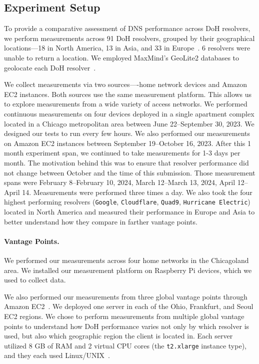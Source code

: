 \subsection{Experiment Setup}
To provide a comparative assessment of DNS
performance across DoH resolvers, we perform measurements across 91 DoH
resolvers, grouped by their geographical locations—18 in North America, 13 in
Asia, and 33 in Europe~\cite{dnscrypt}. 6 resolvers were unable to return a location. 
We employed MaxMind's GeoLite2 databases to geolocate each DoH resolver~\cite{maxmind}.

We collect measurements via two sources—-home network devices and Amazon EC2 instances. 
Both sources use the same measurement platform. This allows us to explore measurements from a wide variety
of access networks. We performed continuous measurements on four devices deployed in a single apartment complex located in a 
Chicago metropolitan area between June 22--September 30, 2023. We designed our tests to run every few hours. We also performed our measurements on Amazon EC2 instances between September 19--October 16, 2023. 
After this 1 month experiment span, we continued to take measurements for 1-3 days per month. 
The motivation behind this was to ensure that resolver performance did not change between October
and the time of this submission. Those measurement spans were February 8--February 10, 2024, 
March 12--March 13, 2024, April 12--April 14. Measurements were performed three times a day. 
We also took the four highest performing resolvers (\texttt{Google}, \texttt{Cloudflare}, \texttt{Quad9},
\texttt{Hurricane Electric}) located in North America and measured their
performance in Europe and Asia to better understand how they compare in
farther vantage points. 

\paragraph{Vantage Points.} 
We performed our measurements across four home networks in the Chicagoland area. 
We installed our measurement platform on Raspberry Pi devices, which we used to 
collect data. 

We also performed our measurements from three global
vantage points through Amazon EC2~\cite{amazon_ec2}.  We deployed one server
in each of the Ohio, Frankfurt, and Seoul EC2 regions.  We chose to perform
measurements from multiple global vantage points to understand how DoH
performance varies not only by which resolver is used, but also which
geographic region the client is located in.  Each server utilized 8 GB of RAM
and 2 virtual CPU cores (the \texttt{t2.xlarge} instance type), and they each
used Linux/UNIX~\cite{amazon_ec2_instance_types}.

